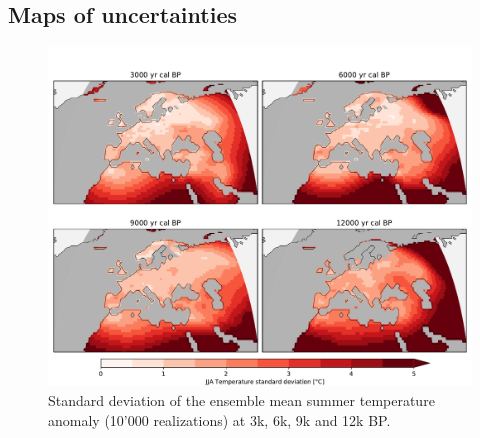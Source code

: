 \begin{refsection}
\begin{subappendices}
	\section{Maps of uncertainties} \label{sec:gridding-suppl-maps}
		\begin{figure}[h]
			\includegraphics[width=\linewidth]{gridding-figures/ensemble-std.pdf}
			\caption[Ensemble standard deviation]{Standard deviation of the ensemble mean summer temperature anomaly (10'000 realizations) at 3k, 6k, 9k and 12k BP. }
			\label{fig:gridding-gridded-std}
		\end{figure}
	

\end{subappendices}
\end{refsection}
